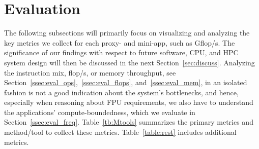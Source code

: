 \section{Evaluation}\label{sec:eval}
%
The following subsections will primarily focus on visualizing and analyzing the key metrics we collect for each proxy- and mini-app,
such as \unit[]{Gflop/s}. The significance of our findings with respect to future software, CPU, and HPC system design will then
be discussed in the next Section~\ref{sec:discuss}.
Analyzing the instruction mix, \unit[]{flop/s}, or memory throughput,
see Section~\ref{ssec:eval_ops},~\ref{ssec:eval_flops}, and~\ref{ssec:eval_mem},
in an isolated fashion is not a good indication about the system's bottlenecks,
and hence, especially when reasoning about FPU requirements, we also have to understand
the applications' compute-boundedness, which we evaluate in Section~\ref{ssec:eval_freq}.
Table~\ref{tb:Mtools} summarizes the primary metrics and method/tool to collect these metrics. Table~\ref{table:rest} includes additional metrics. 
%

